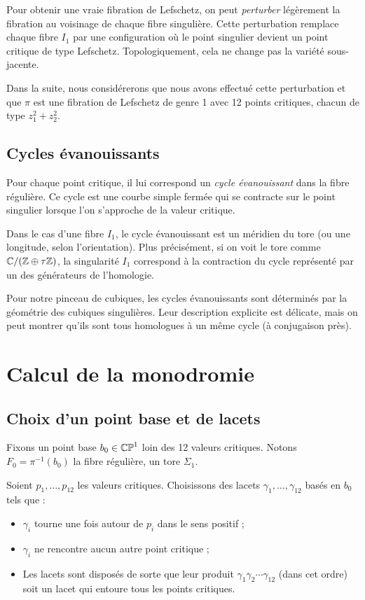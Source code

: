 Pour obtenir une vraie fibration de Lefschetz, on peut \emph{perturber} légèrement la fibration au voisinage de chaque fibre singulière. Cette perturbation remplace chaque fibre $I_1$ par une configuration où le point singulier devient un point critique de type Lefschetz. Topologiquement, cela ne change pas la variété sous-jacente.

\begin{remarque}
Dans la suite, nous considérerons que nous avons effectué cette perturbation et que $\pi$ est une fibration de Lefschetz de genre 1 avec 12 points critiques, chacun de type $z_1^2 + z_2^2$.
\end{remarque}

\subsection{Cycles évanouissants}

Pour chaque point critique, il lui correspond un \emph{cycle évanouissant} dans la fibre régulière. Ce cycle est une courbe simple fermée qui se contracte sur le point singulier lorsque l'on s'approche de la valeur critique.

Dans le cas d'une fibre $I_1$, le cycle évanouissant est un méridien du tore (ou une longitude, selon l'orientation). Plus précisément, si on voit le tore comme $\mathbb{C} / (\mathbb{Z} \oplus \tau \mathbb{Z})$, la singularité $I_1$ correspond à la contraction du cycle représenté par un des générateurs de l'homologie.

Pour notre pinceau de cubiques, les cycles évanouissants sont déterminés par la géométrie des cubiques singulières. Leur description explicite est délicate, mais on peut montrer qu'ils sont tous homologues à un même cycle (à conjugaison près).

\section{Calcul de la monodromie}

\subsection{Choix d'un point base et de lacets}

Fixons un point base $b_0 \in \mathbb{CP}^1$ loin des 12 valeurs critiques. Notons $F_0 = \pi^{-1}(b_0)$ la fibre régulière, un tore $\Sigma_1$.

Soient $p_1, \dots, p_{12}$ les valeurs critiques. Choisissons des lacets $\gamma_1, \dots, \gamma_{12}$ basés en $b_0$ tels que :
\begin{itemize}
\item $\gamma_i$ tourne une fois autour de $p_i$ dans le sens positif ;
\item $\gamma_i$ ne rencontre aucun autre point critique ;
\item Les lacets sont disposés de sorte que leur produit $\gamma_1 \gamma_2 \cdots \gamma_{12}$ (dans cet ordre) soit un lacet qui entoure tous les points critiques.
\end{itemize}

